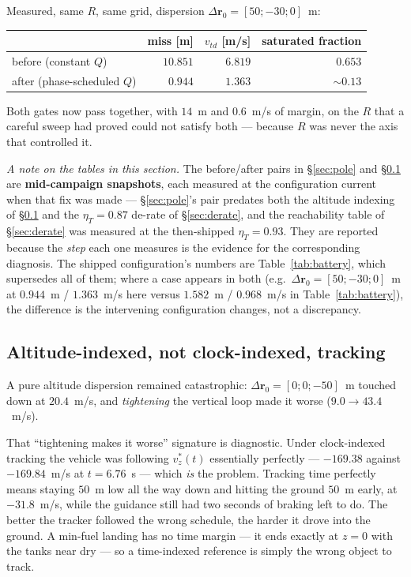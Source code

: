\documentclass[11pt]{article}
\newcommand{\rvec}{\mathbf{r}}
\newcommand{\etaT}{\eta_T}
\begin{document}
Measured, same $R$, same grid, dispersion $\Delta\rvec_0 = [50;-30;0]$~m:

\begin{center}
\begin{tabular}{lrrr}
\toprule
& miss [m] & $v_{td}$ [m/s] & saturated fraction \\
\midrule
before (constant $Q$) & $10.851$ & $6.819$ & $0.653$ \\
after (phase-scheduled $Q$) & $0.944$ & $1.363$ & $\sim 0.13$ \\
\bottomrule
\end{tabular}
\end{center}

Both gates now pass together, with $14$~m and $0.6$~m/s of margin, on the
$R$ that a careful sweep had proved could not satisfy both --- because $R$
was never the axis that controlled it.

\emph{A note on the tables in this section.} The before/after pairs in
\S\ref{sec:pole} and \S\ref{sec:altindex} are \textbf{mid-campaign
snapshots}, each measured at the configuration current when that fix was
made --- \S\ref{sec:pole}'s pair predates both the altitude indexing of
\S\ref{sec:altindex} and the $\etaT = 0.87$ de-rate of \S\ref{sec:derate},
and the reachability table of \S\ref{sec:derate} was measured at the
then-shipped $\etaT = 0.93$. They are reported because the \emph{step} each
one measures is the evidence for the corresponding diagnosis. The shipped
configuration's numbers are Table~\ref{tab:battery}, which supersedes all of
them; where a case appears in both (e.g.\ $\Delta\rvec_0 = [50;-30;0]$~m at
$0.944$~m / $1.363$~m/s here versus $1.582$~m / $0.968$~m/s in
Table~\ref{tab:battery}), the difference is the intervening configuration
changes, not a discrepancy.

\subsection{Altitude-indexed, not clock-indexed, tracking}
\label{sec:altindex}

A pure altitude dispersion remained catastrophic: $\Delta\rvec_0 =
[0;0;-50]$~m touched down at $20.4$~m/s, and \emph{tightening} the vertical
loop made it worse ($9.0 \to 43.4$~m/s).

That ``tightening makes it worse'' signature is diagnostic. Under clock-indexed
tracking the vehicle was following $v_z^\ast(t)$ essentially perfectly ---
$-169.38$ against $-169.84$~m/s at $t = 6.76$~s --- which \emph{is} the
problem. Tracking time perfectly means staying $50$~m low all the way down
and hitting the ground $50$~m early, at $-31.8$~m/s, while the guidance
still had two seconds of braking left to do. The better the tracker followed
the wrong schedule, the harder it drove into the ground. A min-fuel landing
has no time margin --- it ends exactly at $z = 0$ with the tanks near dry
--- so a time-indexed reference is simply the wrong object to track.
\end{document}
